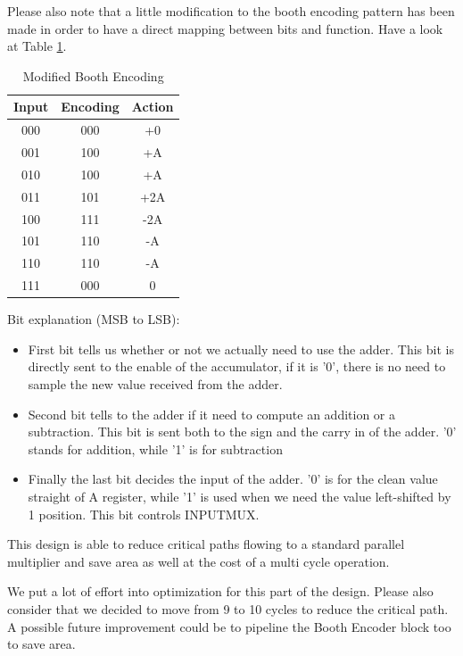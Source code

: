 \documentclass[12pt]{article}
\begin{document}
Please also note that a little modification to the booth encoding pattern has been made in order to have a direct mapping between bits and function. Have a look at Table \ref{BOOTHENC}.
\begin{table}
\begin{center}
	\begin{tabular}{ | c | c | c |}
		\hline
		\rowcolor{LimeGreen} Input & Encoding & Action \\ \hline
		000 & 000 & +0 \\ \hline
		001 & 100 & +A \\ \hline
		010 & 100 & +A \\ \hline
		011 & 101 & +2A \\ \hline
		100 & 111 & -2A \\ \hline
		101 & 110 & -A \\ \hline
		110 & 110 & -A \\ \hline
		111 & 000 & 0 \\ \hline
		
	\end{tabular}
	\caption{Modified Booth Encoding}
	\label{BOOTHENC}
\end{center}
\end{table}


Bit explanation (MSB to LSB):
\begin{itemize}
	\item First bit tells us whether or not we actually need to use the adder. This bit is directly sent to the enable of the accumulator, if it is '0', there is no need to sample the new value received from the adder.
	\item Second bit tells to the adder if it need to compute an addition or a subtraction. This bit is sent both to the sign and the carry in of the adder. '0' stands for addition, while '1' is for subtraction
	\item Finally the last bit decides the input of the adder. '0' is for the clean value straight of A register, while '1' is used when we need the value left-shifted by 1 position. This bit controls INPUTMUX.
\end{itemize}

This design is able to reduce critical paths flowing to a standard parallel multiplier and save area as well at the cost of a multi cycle operation. 

We put a lot of effort into optimization for this part of the design. Please also consider that we decided to move from 9 to 10 cycles to reduce the critical path.
A possible future improvement could be to pipeline the Booth Encoder block too to save area.
\end{document}
